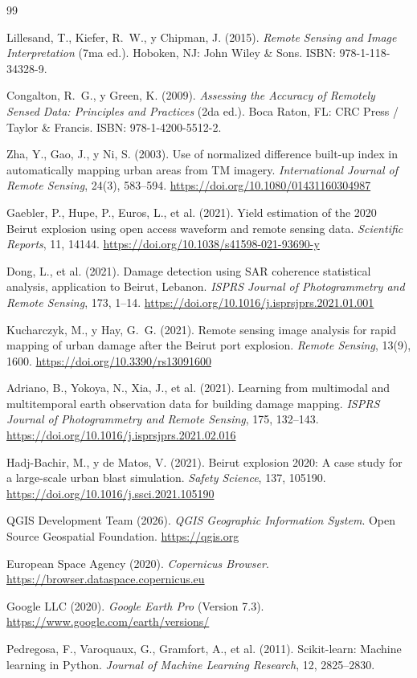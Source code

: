 \documentclass[12pt, a4paper]{article}
\begin{document}

\begin{thebibliography}{99}

Lillesand, T., Kiefer, R.~W., y Chipman, J. (2015).
\textit{Remote Sensing and Image Interpretation} (7ma ed.).
Hoboken, NJ: John Wiley \& Sons.
ISBN: 978-1-118-34328-9.

Congalton, R.~G., y Green, K. (2009).
\textit{Assessing the Accuracy of Remotely Sensed Data: Principles and Practices} (2da ed.).
Boca Raton, FL: CRC Press / Taylor \& Francis.
ISBN: 978-1-4200-5512-2.

Zha, Y., Gao, J., y Ni, S. (2003).
Use of normalized difference built-up index in automatically mapping urban areas from TM imagery.
\textit{International Journal of Remote Sensing}, 24(3), 583--594.
\url{https://doi.org/10.1080/01431160304987}

Gaebler, P., Hupe, P., Euros, L., et al. (2021).
Yield estimation of the 2020 Beirut explosion using open access waveform and remote sensing data.
\textit{Scientific Reports}, 11, 14144.
\url{https://doi.org/10.1038/s41598-021-93690-y}

Dong, L., et al. (2021).
Damage detection using SAR coherence statistical analysis, application to Beirut, Lebanon.
\textit{ISPRS Journal of Photogrammetry and Remote Sensing}, 173, 1--14.
\url{https://doi.org/10.1016/j.isprsjprs.2021.01.001}

Kucharczyk, M., y Hay, G.~G. (2021).
Remote sensing image analysis for rapid mapping of urban damage after the Beirut port explosion.
\textit{Remote Sensing}, 13(9), 1600.
\url{https://doi.org/10.3390/rs13091600}

Adriano, B., Yokoya, N., Xia, J., et al. (2021).
Learning from multimodal and multitemporal earth observation data for building damage mapping.
\textit{ISPRS Journal of Photogrammetry and Remote Sensing}, 175, 132--143.
\url{https://doi.org/10.1016/j.isprsjprs.2021.02.016}

Hadj-Bachir, M., y de Matos, V. (2021).
Beirut explosion 2020: A case study for a large-scale urban blast simulation.
\textit{Safety Science}, 137, 105190.
\url{https://doi.org/10.1016/j.ssci.2021.105190}

QGIS Development Team (2026).
\textit{QGIS Geographic Information System}.
Open Source Geospatial Foundation.
\url{https://qgis.org}

European Space Agency (2020).
\textit{Copernicus Browser}.
\url{https://browser.dataspace.copernicus.eu}

Google LLC (2020).
\textit{Google Earth Pro} (Version 7.3).
\url{https://www.google.com/earth/versions/}

Pedregosa, F., Varoquaux, G., Gramfort, A., et al. (2011).
Scikit-learn: Machine learning in Python.
\textit{Journal of Machine Learning Research}, 12, 2825--2830.

\end{thebibliography}
\end{document}
